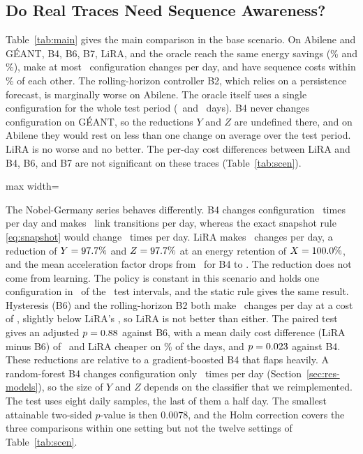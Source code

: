 \documentclass[preprint,12pt]{elsarticle}
\begin{document}
\subsection{Do Real Traces Need Sequence Awareness?}\label{sec:res-main}

Table~\ref{tab:main} gives the main comparison in the base scenario. On Abilene and G\'{E}ANT, B4, B6, B7, LiRA, and the oracle reach the same energy savings (\abiSav\% and \geaSav\%), make at most \abiBFourchg\ configuration changes per day, and have sequence costs within \realSpread\% of each other. The rolling-horizon controller B2, which relies on a persistence forecast, is marginally worse on Abilene. The oracle itself uses a single configuration for the whole test period (\abiTestDays\ and \geaTestDays\ days). B4 never changes configuration on G\'{E}ANT, so the reductions $Y$ and $Z$ are undefined there, and on Abilene they would rest on less than one change on average over the test period. LiRA is no worse and no better. The per-day cost differences between LiRA and B4, B6, and B7 are not significant on these traces (Table~\ref{tab:scen}).

\begin{table}[t]
\centering
\caption{Main Comparison in the Base Scenario (Test Split). Means with 95\% Confidence Intervals over Five Seeds for B4, B6, B7, and LiRA; Single Values Otherwise. Latency Is the Median Decision Time}
\label{tab:main}
\footnotesize
\setlength{\tabcolsep}{4pt}
\begin{adjustbox}{max width=\textwidth}\end{adjustbox}
\end{table}

The Nobel-Germany series behaves differently. B4 changes configuration \nobBFourchg\ times per day and makes \nobBFourtrans\ link transitions per day, whereas the exact snapshot rule \eqref{eq:snapshot} would change \nobSnapChg\ times per day. LiRA makes \nobLiRAchg\ changes per day, a reduction of $Y=97.7\%$ and $Z=97.7\%$ at an energy retention of $X=100.0\%$, and the mean acceleration factor drops from \nobAFfour\ for B4 to \nobAFlira. The reduction does not come from learning. The policy is constant in this scenario and holds one configuration in \liraHold\ of the \nobTestIntervals\ test intervals, and the static rule gives the same result. Hysteresis (B6) and the rolling-horizon B2 both make \nobBsixChg\ changes per day at a cost of \nobJBsixbase, slightly below LiRA's \nobJLiRAbase, so LiRA is not better than either. The paired test gives an adjusted $p=0.88$ against B6, with a mean daily cost difference (LiRA minus B6) of \effBsixbase\ and LiRA cheaper on \effBsixDaysbase\% of the days, and $p=0.023$ against B4. These reductions are relative to a gradient-boosted B4 that flaps heavily. A random-forest B4 changes configuration only \modRfChg\ times per day (Section~\ref{sec:res-models}), so the size of $Y$ and $Z$ depends on the classifier that we reimplemented. The test uses eight daily samples, the last of them a half day. The smallest attainable two-sided $p$-value is then $0.0078$, and the Holm correction covers the three comparisons within one setting but not the twelve settings of Table~\ref{tab:scen}.
\end{document}
